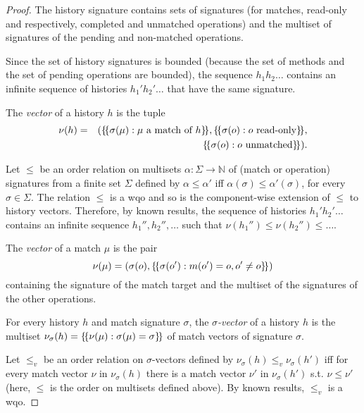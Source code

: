 \begin{proof}
The history signature contains sets of signatures
(for matches, read-only and respectively, completed and unmatched operations)
and the multiset of signatures of the pending and non-matched operations.

Since the set of history signatures is bounded (because the set of methods
and the set of pending operations are bounded),
the sequence $h_1 h_2\ldots $ contains an infinite sequence of histories $h_1' h_2' \ldots$ that have
the same signature.

%

The \emph{vector} of a history $h$ is the tuple
\begin{align*}
\nu(h)&=&({\{\!\{ \sigma(\mu): \mu\mbox{ a match of $h$} \}\!\}}, {\{\!\{ \sigma(o): o\mbox{ read-only} \}\!\}}, \\
&& {\{\!\{ \sigma(o): o\mbox{ unmatched} \}\!\}}).
\end{align*}

Let $\leq$ be an order relation on multisets $\alpha:\Sigma\rightarrow\mathbb{N}$ of (match or operation) signatures from a finite set $\Sigma$
defined by $\alpha\leq\alpha'$ iff $\alpha(\sigma)\leq\alpha'(\sigma)$, for every $\sigma\in\Sigma$.
The relation $\leq$ is a wqo and so is the component-wise extension of $\leq$ to history vectors.
Therefore, by known results, the sequence of histories $h_1' h_2' \ldots$ contains
an infinite sequence $h_1'',h_2'',\ldots$ such that $\nu(h_1'')\leq \nu(h_2'')\leq \ldots$.

The \emph{vector} of a match $\mu$ is the pair
\[
\nu(\mu)=(\sigma(o),{\{\!\{ \sigma(o') : m(o')=o, o'\neq o \}\!\}})
\]
containing the signature of the match target and the multiset of the signatures of the other operations.

For every history $h$ and match signature $\sigma$, the \emph{$\sigma$-vector} of a history $h$ is the multiset
$
\nu_\sigma(h)={\{\!\{ \nu(\mu): \sigma(\mu)=\sigma \}\!\}}
$
of match vectors of signature $\sigma$.

Let $\leq_v$ be an order relation on $\sigma$-vectors defined by $\nu_\sigma(h)\leq_v \nu_\sigma(h')$ iff
for every match vector $\nu$ in $\nu_\sigma(h)$ there is a match vector $\nu'$ in $\nu_\sigma(h')$
	s.t. $\nu\leq \nu'$ (here, $\leq$ is the order on multisets defined above).
By known results, $\leq_v$ is a wqo.


\end{proof}
